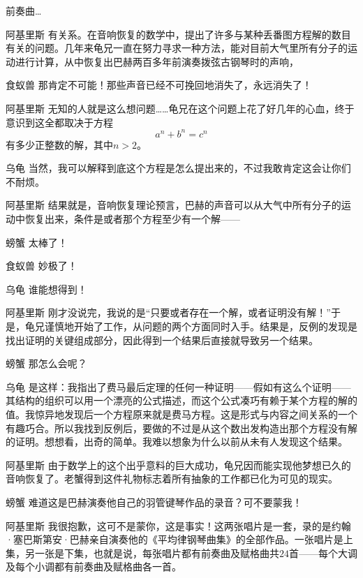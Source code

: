 \begin{dialog}{前奏曲…}
\begin{dialogue}
\item[阿基里斯]有关系。在音响恢复的数学中，提出了许多与某种丢番图方程解的数目有关的问题。几年来龟兄一直在努力寻求一种方法，能对目前大气里所有分子的运动进行计算，从中恢复出巴赫两百多年前演奏拨弦古钢琴时的声响，

\item[食蚁兽]那肯定不可能！那些声音已经不可挽回地消失了，永远消失了！

\item[阿基里斯]无知的人就是这么想问题……龟兄在这个问题上花了好几年的心血，终于意识到这全都取决于方程
\[
  a^n+b^n=c^n
\]
有多少正整数的解，其中$n>2$。

\item[乌龟]当然，我可以解释到底这个方程是怎么提出来的，不过我敢肯定这会让你们不耐烦。

\item[阿基里斯]结果就是，音响恢复理论预言，巴赫的声音可以从大气中所有分子的运动中恢复出来，条件是或者那个方程至少有一个解——

\item[螃蟹]太棒了！

\item[食蚁兽]妙极了！

\item[乌龟]谁能想得到！

\item[阿基里斯]刚才没说完，我说的是“只要或者存在一个解，或者证明没有解！”于是，龟兄谨慎地开始了工作，从问题的两个方面同时入手。结果是，反例的发现是找出证明的关键组成部分，因此得到一个结果后直接就导致另一个结果。

\item[螃蟹]那怎么会呢？

\item[乌龟]是这样：我指出了费马最后定理的任何一种证明——假如有这么个证明——其结构的组织可以用一个漂亮的公式描述，而这个公式凑巧有赖于某个方程的解的值。我惊异地发现后一个方程原来就是费马方程。这是形式与内容之间关系的一个有趣巧合。所以我找到反例后，要做的不过是从这个数出发构造出那个方程没有解的证明。想想看，出奇的简单。我难以想象为什么以前从未有人发现这个结果。

\item[阿基里斯]由于数学上的这个出乎意料的巨大成功，龟兄因而能实现他梦想已久的音响恢复了。老蟹得到这件礼物标志着所有抽象的工作都已化为可见的现实。

\item[螃蟹]难道这是巴赫演奏他自己的羽管键琴作品的录音？可不要蒙我！

\item[阿基里斯]我很抱歉，这可不是蒙你，这是事实！这两张唱片是一套，录的是约翰·塞巴斯第安·巴赫亲自演奏他的《平均律钢琴曲集》的全部作品。一张唱片是上集，另一张是下集，也就是说，每张唱片都有前奏曲及赋格曲共$24$首——每个大调及每个小调都有前奏曲及赋格曲各一首。


\end{dialogue}
\end{dialog}
